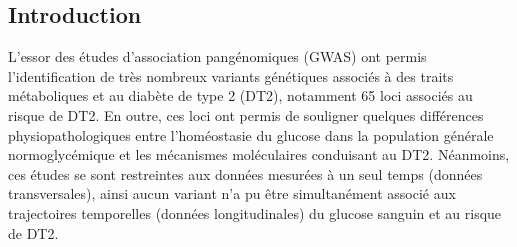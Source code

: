 \documentclass[a0,portrait]{a0poster}
\begin{document}
\begin{multicols}{2} %



\color{DarkSlateGray}
\section*{Introduction}
L'essor des études d'association pangénomiques (GWAS) ont permis l'identification de très nombreux variants génétiques associés à des traits métaboliques et au diabète de type 2 (DT2), notamment 65 loci associés au risque de DT2. En outre, ces loci ont permis de souligner quelques différences physiopathologiques entre l’homéostasie du glucose dans la population générale normoglycémique et les mécanismes moléculaires conduisant au DT2. Néanmoins, ces études se sont restreintes aux données mesurées à un seul temps (données transversales), ainsi aucun variant n'a pu être simultanément associé aux trajectoires temporelles (données longitudinales) du glucose sanguin et au risque de DT2.


\color{SaddleBrown} %

\end{multicols}
\end{document}
